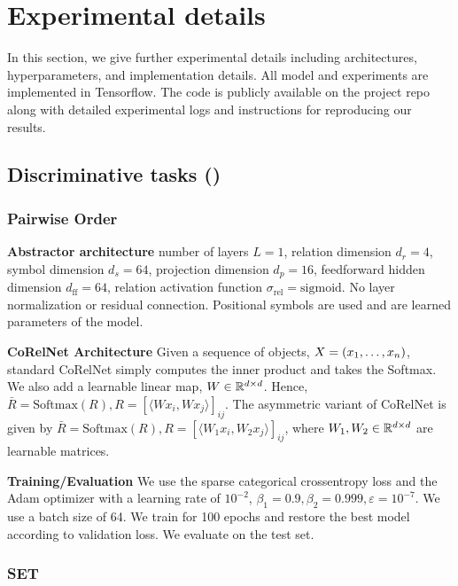 \section{Experimental details}\label{sec:experimental_details}

In this section, we give further experimental details including architectures, hyperparameters, and implementation details. All model and experiments are implemented in Tensorflow. The code is publicly available on the project repo along with detailed experimental logs and instructions for reproducing our results.

\subsection{Discriminative tasks ()}

\subsubsection{Pairwise Order}
\textbf{Abstractor architecture} number of layers $L = 1$, relation dimension $d_r = 4$, symbol dimension $d_s = 64$, projection dimension $d_p = 16$, feedforward hidden dimension $d_{\mathrm{ff}} = 64$, relation activation function $\sigma_{\mathrm{rel}} = \mathrm{sigmoid}$. No layer normalization or residual connection. Positional symbols are used  and are learned parameters of the model.

\textbf{CoRelNet Architecture} Given a sequence of objects, $X = (x_1, \ldots, x_n)$, standard CoRelNet simply computes the inner product and takes the Softmax. We also add a learnable linear map, $W \in \mathbb{R}^{d \times d}$. Hence, $\bar{R} = \text{Softmax}(R), R = {\left[\langle W x_i, W x_j\rangle\right]}_{ij}$. The asymmetric variant of CoRelNet is given by $\bar{R} = \text{Softmax}(R), R = {\left[\langle W_1 x_i, W_2 x_j\rangle\right]}_{ij}$, where $W_1, W_2 \in \mathbb{R}^{d \times d}$ are learnable matrices.

\textbf{Training/Evaluation} We use the sparse categorical crossentropy loss and the Adam optimizer with a learning rate of $10^{-2}$, $\beta_1 = 0.9, \beta_2 = 0.999, \varepsilon = 10^{-7}$. We use a batch size of 64. We train for 100 epochs and restore the best model according to validation loss. We evaluate on the test set.

\subsubsection{SET}

